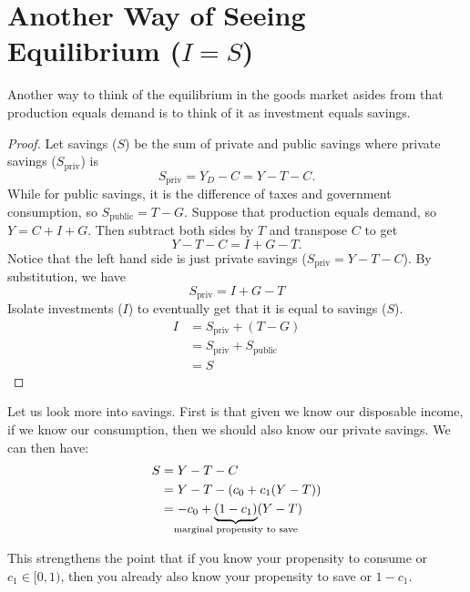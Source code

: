 \documentclass{extarticle}
\begin{document}
\section{Another Way of Seeing Equilibrium ($I = S$)}
Another way to think of the equilibrium in the goods market asides from that production equals demand is to think of it as investment equals savings.
\begin{proof}
  Let savings ($S$) be the sum of private and public savings where private savings ($S_{\text{priv}}$) is
  $$S_{\text{priv}} = Y_D - C = Y - T - C.$$
  While for public savings, it is the difference of taxes and government consumption, so $S_{\text{public}} = T - G$. Suppose that production equals demand, so $Y = C + I + G$. Then subtract both sides by $T$ and transpose $C$ to get
  $$ Y - T - C = I + G - T.$$
  Notice that the left hand side is just private savings ($S_{\text{priv}} = Y - T - C$). By substitution, we have
  $$S_{\text{priv}} = I + G - T$$
  Isolate investments ($I$) to eventually get that it is equal to savings ($S$).
  \begin{align*}
    I &= S_{\text{priv}} + (T - G) \\
    &= S_{\text{priv}} + S_{\text{public}} \\
    &= S
  \end{align*}
\end{proof}

Let us look more into savings. First is that given we know our disposable income, if we know our consumption, then we should also know our private savings. We can then have:
\begin{align*}
  S &= Y - T - C \\
    &= Y - T - (c_0 + c_1(Y-T)) \\
    &= -c_0 + \underbrace{(1-c_1)}_{\mathclap{\text{marginal propensity to save}}}(Y-T)
\end{align*}

This strengthens the point that if you know your propensity to consume or $c_1 \in [0, 1)$, then you already also know your propensity to save or $1-c_1$.
\end{document}
